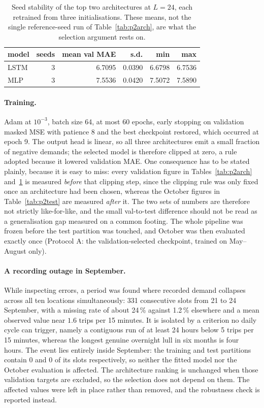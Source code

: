 \documentclass[11pt,a4paper]{article}
\begin{document}
\begin{table}[H]
\centering
\caption{Seed stability of the top two architectures at $L=24$, each retrained from three initialisations. These means, not the single reference-seed run of Table~\ref{tab:p2arch}, are what the selection argument rests on.}
\label{tab:seeds}
\begin{tabular}{lrrrrr}
\toprule
model & seeds & mean val MAE & s.d. & min & max \\
\midrule
LSTM & 3 & 6.7095 & 0.0390 & 6.6798 & 6.7536 \\
MLP & 3 & 7.5536 & 0.0420 & 7.5072 & 7.5890 \\
\bottomrule
\end{tabular}
\end{table}

\paragraph{Training.} Adam at $10^{-3}$, batch size 64, at most 60 epochs, early
stopping on validation masked MSE with patience 8 and the best checkpoint restored,
which occurred at epoch 9. The output head is linear, so
all three architectures emit a small fraction of negative demands; the selected model
is therefore clipped at zero, a rule adopted because it lowered validation MAE. One
consequence has to be stated plainly, because it is easy to miss: every validation
figure in Tables~\ref{tab:p2arch} and~\ref{tab:seeds} is measured
\emph{before} that clipping step, since the clipping rule was only fixed once an
architecture had been chosen, whereas the October figures in
Table~\ref{tab:p2test} are measured \emph{after} it. The two sets of numbers are
therefore not strictly like-for-like, and the small val-to-test difference should not
be read as a generalisation gap measured on a common footing. The whole pipeline was
frozen before the test partition was touched, and October was then evaluated exactly
once (Protocol A: the validation-selected checkpoint, trained on May--August only).

\paragraph{A recording outage in September.} While inspecting errors, a period was
found where recorded demand collapses across all ten locations simultaneously:
331 consecutive slots from 21 to 24 September, with a
missing rate of about 24\,\% against 1.2\,\% elsewhere and a mean observed value near
$1.6$ trips per 15 minutes. It is isolated by a criterion no daily cycle can trigger, namely
a contiguous run of at least 24 hours below 5 trips per 15 minutes,
whereas the longest genuine overnight lull in six months is four hours. The event lies entirely
inside September: the training and test partitions contain
0 and 0 of its slots
respectively, so neither the fitted model nor the October evaluation is affected. The
architecture ranking is unchanged when those validation targets are excluded, so the
selection does not depend on them. The affected values were left in place rather than
removed, and the robustness check is reported instead.
\end{document}
